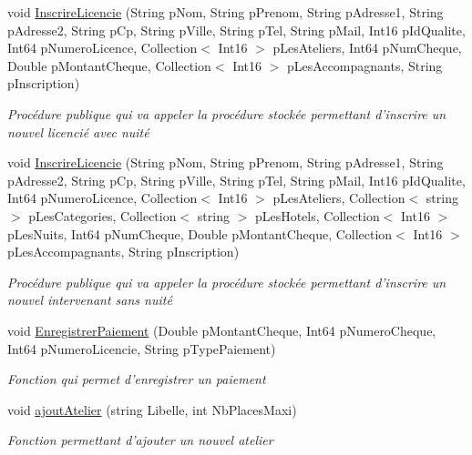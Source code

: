 \begin{DoxyCompactItemize}
\item 
void \hyperlink{class_base_de_donnees_1_1_bdd_a47e6453dc9e7851ca41b8d68a358214f}{Inscrire\+Licencie} (String p\+Nom, String p\+Prenom, String p\+Adresse1, String p\+Adresse2, String p\+Cp, String p\+Ville, String p\+Tel, String p\+Mail, Int16 p\+Id\+Qualite, Int64 p\+Numero\+Licence, Collection$<$ Int16 $>$ p\+Les\+Ateliers, Int64 p\+Num\+Cheque, Double p\+Montant\+Cheque, Collection$<$ Int16 $>$ p\+Les\+Accompagnants, String p\+Inscription)
\begin{DoxyCompactList}\small\item\em Procédure publique qui va appeler la procédure stockée permettant d'inscrire un nouvel licencié avec nuité \end{DoxyCompactList}\item 
void \hyperlink{class_base_de_donnees_1_1_bdd_aeea37a4bfb9bf95ef02f350c39d003f4}{Inscrire\+Licencie} (String p\+Nom, String p\+Prenom, String p\+Adresse1, String p\+Adresse2, String p\+Cp, String p\+Ville, String p\+Tel, String p\+Mail, Int16 p\+Id\+Qualite, Int64 p\+Numero\+Licence, Collection$<$ Int16 $>$ p\+Les\+Ateliers, Collection$<$ string $>$ p\+Les\+Categories, Collection$<$ string $>$ p\+Les\+Hotels, Collection$<$ Int16 $>$ p\+Les\+Nuits, Int64 p\+Num\+Cheque, Double p\+Montant\+Cheque, Collection$<$ Int16 $>$ p\+Les\+Accompagnants, String p\+Inscription)
\begin{DoxyCompactList}\small\item\em Procédure publique qui va appeler la procédure stockée permettant d'inscrire un nouvel intervenant sans nuité \end{DoxyCompactList}\item 
void \hyperlink{class_base_de_donnees_1_1_bdd_a32cef1502d8342b040476519c7b6df1e}{Enregistrer\+Paiement} (Double p\+Montant\+Cheque, Int64 p\+Numero\+Cheque, Int64 p\+Numero\+Licencie, String p\+Type\+Paiement)
\begin{DoxyCompactList}\small\item\em Fonction qui permet d'enregistrer un paiement \end{DoxyCompactList}\item 
void \hyperlink{class_base_de_donnees_1_1_bdd_a5c46dd24715a9f9c7298f965963f632c}{ajout\+Atelier} (string Libelle, int Nb\+Places\+Maxi)
\begin{DoxyCompactList}\small\item\em Fonction permettant d'ajouter un nouvel atelier \end{DoxyCompactList}\item 

\end{DoxyCompactItemize}

